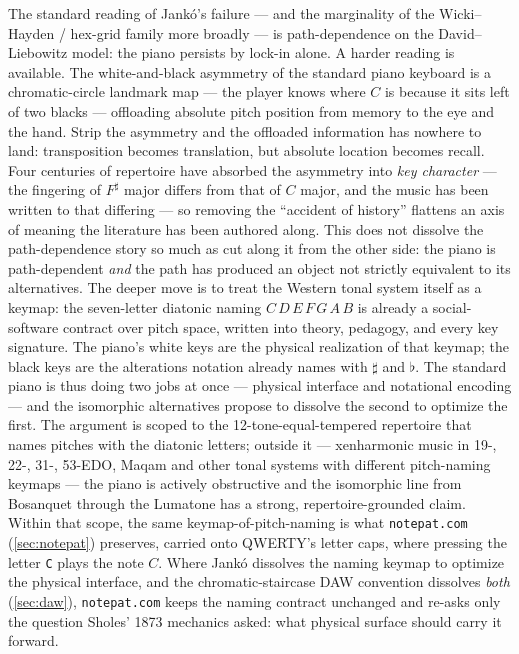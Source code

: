 \documentclass[10pt,letterpaper,twocolumn]{article}
\begin{document}
The standard reading of Jankó's failure --- and the marginality of the Wicki--Hayden / hex-grid family more broadly --- is path-dependence on the David--Liebowitz model: the piano persists by lock-in alone. A harder reading is available. The white-and-black asymmetry of the standard piano keyboard is a chromatic-circle landmark map --- the player knows where $C$ is because it sits left of two blacks --- offloading absolute pitch position from memory to the eye and the hand. Strip the asymmetry and the offloaded information has nowhere to land: transposition becomes translation, but absolute location becomes recall. Four centuries of repertoire have absorbed the asymmetry into \emph{key character} --- the fingering of $F^\sharp$ major differs from that of $C$ major, and the music has been written to that differing --- so removing the ``accident of history'' flattens an axis of meaning the literature has been authored along. This does not dissolve the path-dependence story so much as cut along it from the other side: the piano is path-dependent \emph{and} the path has produced an object not strictly equivalent to its alternatives. The deeper move is to treat the Western tonal system itself as a keymap: the seven-letter diatonic naming $C\,D\,E\,F\,G\,A\,B$ is already a social-software contract over pitch space, written into theory, pedagogy, and every key signature. The piano's white keys are the physical realization of that keymap; the black keys are the alterations notation already names with $\sharp$ and $\flat$. The standard piano is thus doing two jobs at once --- physical interface and notational encoding --- and the isomorphic alternatives propose to dissolve the second to optimize the first. The argument is scoped to the 12-tone-equal-tempered repertoire that names pitches with the diatonic letters; outside it --- xenharmonic music in 19-, 22-, 31-, 53-EDO, Maqam and other tonal systems with different pitch-naming keymaps --- the piano is actively obstructive and the isomorphic line from Bosanquet through the Lumatone has a strong, repertoire-grounded claim. Within that scope, the same keymap-of-pitch-naming is what \texttt{notepat.com} (\textsection\ref{sec:notepat}) preserves, carried onto QWERTY's letter caps, where pressing the letter \texttt{C} plays the note $C$. Where Jankó dissolves the naming keymap to optimize the physical interface, and the chromatic-staircase DAW convention dissolves \emph{both} (\textsection\ref{sec:daw}), \texttt{notepat.com} keeps the naming contract unchanged and re-asks only the question Sholes' 1873 mechanics asked: what physical surface should carry it forward.
\end{document}
